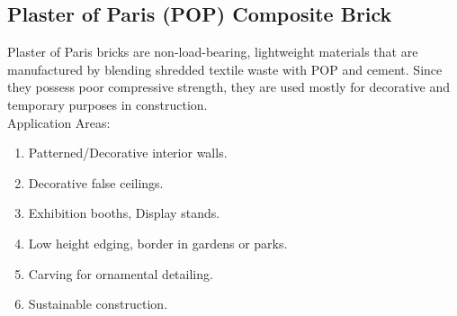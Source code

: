 \subsection{Plaster of Paris (POP) Composite Brick}
Plaster of Paris bricks are non-load-bearing, lightweight materials that are manufactured by blending shredded textile waste with POP and cement. Since they possess poor compressive strength, they are used mostly for decorative and temporary purposes in construction. \\

\noindent Application Areas:
\begin{enumerate}
	\item Patterned/Decorative interior walls.
	\item Decorative false ceilings.
	\item Exhibition booths, Display stands.
	\item Low height edging, border in gardens or parks.
	\item Carving for ornamental detailing.
	\item Sustainable construction.
\end{enumerate}